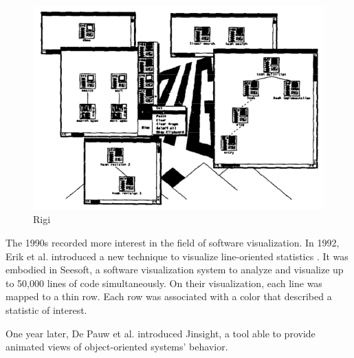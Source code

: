 \begin{figure}[ht]
  \includegraphics[width=\linewidth]{Mueller1988_Rigi.png}
  \caption{Rigi}
\endminipage\hfill
  \end{figure}



\bigbreak
The 1990s recorded more interest in the field of software visualization. 
In 1992, Erik et al. introduced a new technique to visualize line-oriented statistics \cite{Eick1992}. 
It was embodied in Seesoft, a software visualization system to analyze and visualize up to 50,000 lines of code simultaneously. 
On their visualization, each line was mapped to a thin row. Each row was associated with a color that described a statistic of interest.

\bigbreak
One year later, De Pauw et al. \cite{DePauw1993} introduced Jinsight, a tool able to provide animated views of object-oriented systems' behavior. 

